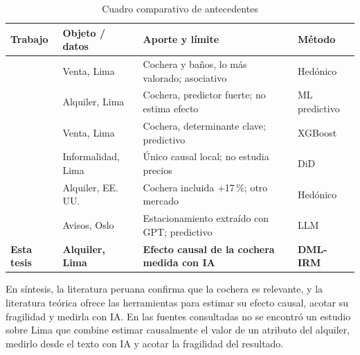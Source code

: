 \begin{table}[H]
\centering\small
\caption{Cuadro comparativo de antecedentes}\label{tab:comparativo}
\begin{tabularx}{\textwidth}{>{\raggedright\arraybackslash}p{2.7cm}>{\raggedright\arraybackslash}p{2.4cm}X>{\raggedright\arraybackslash}p{2.5cm}}
\toprule
Trabajo & Objeto / datos & Aporte y límite & Método \\
\midrule
\citet{mundaca2018} & Venta, Lima & Cochera y baños, lo más valorado; asociativo & Hedónico \\
\citet{cacnahuaray2024} & Alquiler, Lima & Cochera, predictor fuerte; no estima efecto & ML predictivo \\
\citet{barrientos2026} & Venta, Lima & Cochera, determinante clave; predictivo & XGBoost \\
\citet{contreras2024} & Informalidad, Lima & Único causal local; no estudia precios & DiD \\
\citet{gabbe2017} & Alquiler, EE.\,UU. & Cochera incluida +17\,\%; otro mercado & Hedónico \\
\citet{faxvaag2026} & Avisos, Oslo & Estacionamiento extraído con GPT; predictivo & LLM \\
\textbf{Esta tesis} & \textbf{Alquiler, Lima} & \textbf{Efecto causal de la cochera medida con IA} & \textbf{DML-IRM} \\
\bottomrule
\end{tabularx}
\end{table}

En síntesis, la literatura peruana confirma que la cochera es relevante, y la literatura teórica ofrece las herramientas para estimar su efecto causal, acotar su fragilidad y medirla con IA. En las fuentes consultadas no se encontró un estudio sobre Lima que combine estimar causalmente el valor de un atributo del alquiler, medirlo desde el texto con IA y acotar la fragilidad del resultado.
